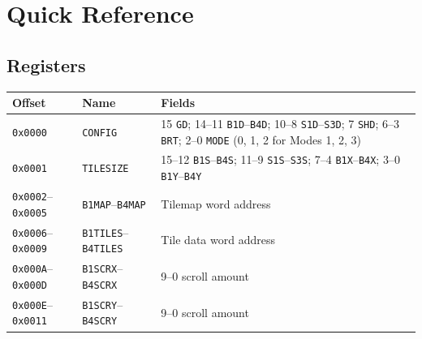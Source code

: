 \chapter{Quick Reference}
\label{app:quick-reference}

\section{Registers}

\begin{table}[H]
	\centering
	\begin{tabular}{llp{7cm}}
		\toprule
		\textbf{Offset}                  & \textbf{Name}                      & \textbf{Fields}                                                                                                                                                        \\
		\midrule
		\texttt{0x0000}                  & \texttt{CONFIG}                    & 15 \texttt{GD}; 14--11 \texttt{B1D}--\texttt{B4D}; 10--8 \texttt{S1D}--\texttt{S3D}; 7 \texttt{SHD}; 6--3 \texttt{BRT}; 2--0 \texttt{MODE} (0, 1, 2 for Modes 1, 2, 3) \\
		\texttt{0x0001}                  & \texttt{TILESIZE}                  & 15--12 \texttt{B1S}--\texttt{B4S}; 11--9 \texttt{S1S}--\texttt{S3S}; 7--4 \texttt{B1X}--\texttt{B4X}; 3--0 \texttt{B1Y}--\texttt{B4Y}                                  \\
		\texttt{0x0002}--\texttt{0x0005} & \texttt{B1MAP}--\texttt{B4MAP}     & Tilemap word address                                                                                                                                                   \\
		\texttt{0x0006}--\texttt{0x0009} & \texttt{B1TILES}--\texttt{B4TILES} & Tile data word address                                                                                                                                                 \\
		\texttt{0x000A}--\texttt{0x000D} & \texttt{B1SCRX}--\texttt{B4SCRX}   & 9--0 scroll amount                                                                                                                                                     \\
		\texttt{0x000E}--\texttt{0x0011} & \texttt{B1SCRY}--\texttt{B4SCRY}   & 9--0 scroll amount                                                                                                                                                     \\

\end{tabular}
\end{table}

